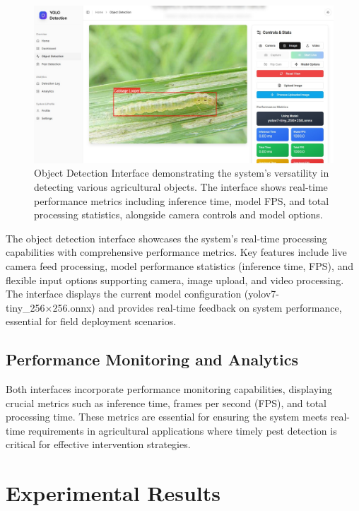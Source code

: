 \documentclass[conference]{IEEEtran}
\begin{document}
\begin{figure}[htbp]
\centerline{\includegraphics[width=\columnwidth]{ui_object_detection.png}}
\caption{Object Detection Interface demonstrating the system's versatility in detecting various agricultural objects. The interface shows real-time performance metrics including inference time, model FPS, and total processing statistics, alongside camera controls and model options.}
\label{fig:ui_object_detection}
\end{figure}

The object detection interface showcases the system's real-time processing capabilities with comprehensive performance metrics. Key features include live camera feed processing, model performance statistics (inference time, FPS), and flexible input options supporting camera, image upload, and video processing. The interface displays the current model configuration (yolov7-tiny\_256×256.onnx) and provides real-time feedback on system performance, essential for field deployment scenarios.

\subsection{Performance Monitoring and Analytics}

Both interfaces incorporate performance monitoring capabilities, displaying crucial metrics such as inference time, frames per second (FPS), and total processing time. These metrics are essential for ensuring the system meets real-time requirements in agricultural applications where timely pest detection is critical for effective intervention strategies.

\section{Experimental Results}
\end{document}
